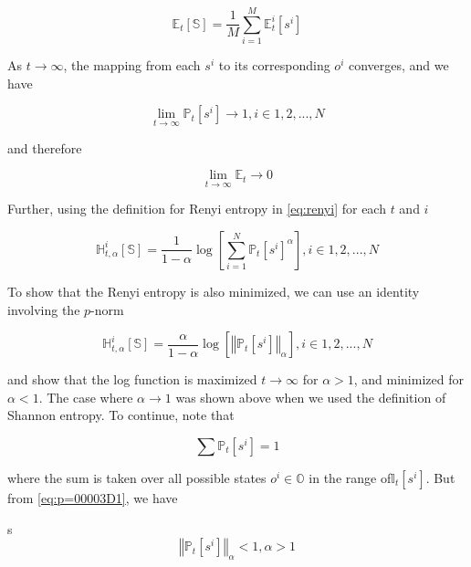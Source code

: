 \documentclass[english]{article}
\begin{document}
\begin{equation}
\mathbb{E}_{t}\left[\mathbb{S}\right]=\frac{1}{M}\sum_{i=1}^{M}\mathbb{E}_{t}^{i}\left[s^{i}\right]\label{eq:weighted sum}
\end{equation}


As $t\rightarrow\infty$, the mapping from each $s^{i}$ to its corresponding
$o^{i}$ converges, and we have

\begin{equation}
\lim_{t\rightarrow\infty}\mathbb{P}_{t}\left[s^{i}\right]\rightarrow1,i\in{1,2,...,N}\label{eq:p=00003D1}
\end{equation}


and therefore

\begin{equation}
\lim_{t\rightarrow\infty}\mathbb{E}_{t}\rightarrow0
\end{equation}


Further, using the definition for Renyi entropy in \ref{eq:renyi}
for each $t$ and $i$

\begin{equation}
\mathbb{H}_{t,\alpha}^{i}\left[\mathbb{S}\right]=\frac{1}{1-\alpha}\log\left[\sum_{i=1}^{N}\mathbb{P}_{t}\left[s^{i}\right]^{\alpha}\right],i\in{1,2,...,N}
\end{equation}


To show that the Renyi entropy is also minimized, we can use an identity
involving the $p$-norm

\begin{equation}
\mathbb{H}_{t,\alpha}^{i}\left[\mathbb{S}\right]=\frac{\alpha}{1-\alpha}\log\left[\left\Vert \mathbb{P}_{t}\left[s^{i}\right]\right\Vert _{\alpha}\right],i\in{1,2,...,N}
\end{equation}


and show that the log function is maximized $t\rightarrow\infty$
for $\alpha>1$, and minimized for $\alpha<1$. The case where $\alpha\rightarrow1$
was shown above when we used the definition of Shannon entropy. To
continue, note that 

\begin{equation}
\sum\mathbb{P}_{t}\left[s^{i}\right]=1
\end{equation}


where the sum is taken over all possible states $o^{i}\in\mathbb{O}$
in the range of$\mathbb{I}_{t}\left[s^{i}\right]$. But from \ref{eq:p=00003D1},
we have

s
\begin{equation}
\left\Vert \mathbb{P}_{t}\left[s^{i}\right]\right\Vert _{\alpha}<1,\alpha>1
\end{equation}
\end{document}
